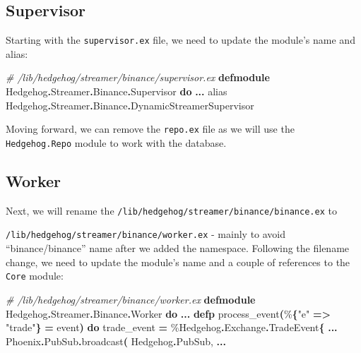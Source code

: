 \documentclass[
  oneside]{book}
\newenvironment{Shaded}{\begin{snugshade}}{\end{snugshade}}
\newcommand{\CommentTok}[1]{\textcolor[rgb]{0.56,0.35,0.01}{\textit{#1}}}
\newcommand{\ConstantTok}[1]{\textcolor[rgb]{0.56,0.35,0.01}{#1}}
\newcommand{\FunctionTok}[1]{\textcolor[rgb]{0.13,0.29,0.53}{\textbf{#1}}}
\newcommand{\ImportTok}[1]{#1}
\newcommand{\KeywordTok}[1]{\textcolor[rgb]{0.13,0.29,0.53}{\textbf{#1}}}
\newcommand{\NormalTok}[1]{#1}
\newcommand{\OperatorTok}[1]{\textcolor[rgb]{0.81,0.36,0.00}{\textbf{#1}}}
\newcommand{\StringTok}[1]{\textcolor[rgb]{0.31,0.60,0.02}{#1}}
\begin{document}
\subsection{Supervisor}\label{supervisor}

Starting with the \texttt{supervisor.ex} file, we need to update the module's name and alias:

\begin{Shaded}
\begin{Highlighting}[]
\CommentTok{\# /lib/hedgehog/streamer/binance/supervisor.ex}
\KeywordTok{defmodule} \ConstantTok{Hedgehog}\OperatorTok{.}\ConstantTok{Streamer}\OperatorTok{.}\ConstantTok{Binance}\OperatorTok{.}\ConstantTok{Supervisor} \KeywordTok{do}
   \OperatorTok{...}
   \ImportTok{alias} \ConstantTok{Hedgehog}\OperatorTok{.}\ConstantTok{Streamer}\OperatorTok{.}\ConstantTok{Binance}\OperatorTok{.}\ConstantTok{DynamicStreamerSupervisor}
\end{Highlighting}
\end{Shaded}

Moving forward, we can remove the \texttt{repo.ex} file as we will use the \texttt{Hedgehog.Repo} module to work with the database.

\subsection{Worker}\label{worker}

Next, we will rename the \texttt{/lib/hedgehog/streamer/binance/binance.ex} to

\texttt{/lib/hedgehog/streamer/binance/worker.ex} - mainly to avoid ``binance/binance'' name after we added the namespace. Following the filename change, we need to update the module's name and a couple of references to the \texttt{Core} module:

\begin{Shaded}
\begin{Highlighting}[]
\CommentTok{\# /lib/hedgehog/streamer/binance/worker.ex}
\KeywordTok{defmodule} \ConstantTok{Hedgehog}\OperatorTok{.}\ConstantTok{Streamer}\OperatorTok{.}\ConstantTok{Binance}\OperatorTok{.}\ConstantTok{Worker} \KeywordTok{do}
\OperatorTok{...}
  \KeywordTok{defp}\NormalTok{ process\_event}\FunctionTok{(}\NormalTok{\%}\FunctionTok{\{}\StringTok{"e"} \OperatorTok{=\textgreater{}} \StringTok{"trade"}\FunctionTok{\}} \OperatorTok{=}\NormalTok{ event}\FunctionTok{)} \KeywordTok{do}
\NormalTok{    trade\_event }\OperatorTok{=}\NormalTok{ \%}\ConstantTok{Hedgehog}\OperatorTok{.}\ConstantTok{Exchange}\OperatorTok{.}\ConstantTok{TradeEvent}\FunctionTok{\{}
\OperatorTok{...}
    \ConstantTok{Phoenix}\OperatorTok{.}\ConstantTok{PubSub}\OperatorTok{.}\NormalTok{broadcast}\FunctionTok{(}
      \ConstantTok{Hedgehog}\OperatorTok{.}\ConstantTok{PubSub}\NormalTok{,}
\OperatorTok{...}
\end{Highlighting}
\end{Shaded}
\end{document}
